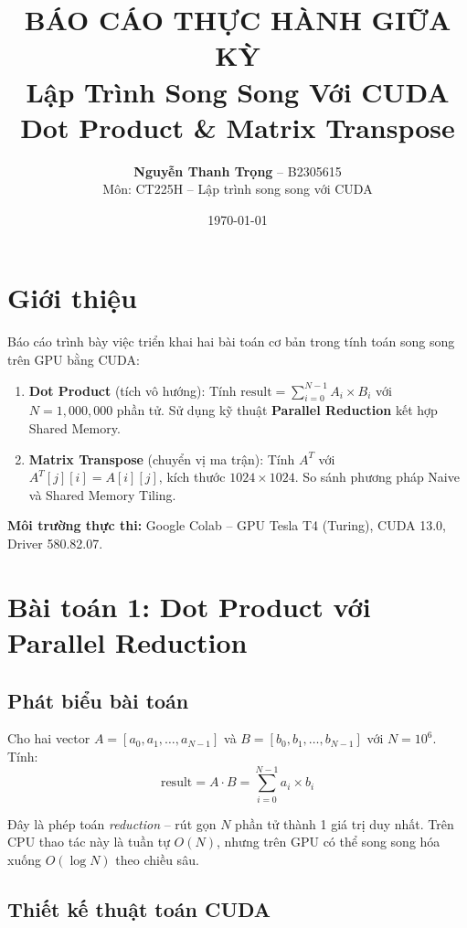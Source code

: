 \documentclass[12pt,a4paper]{article}
\title{
    \vspace{-1cm}
    \textbf{BÁO CÁO THỰC HÀNH GIỮA KỲ} \\[6pt]
    \Large Lập Trình Song Song Với CUDA \\[4pt]
    \large Dot Product \& Matrix Transpose
}
\author{
    \textbf{Nguyễn Thanh Trọng} -- B2305615 \\
    Môn: CT225H -- Lập trình song song với CUDA
}
\date{\today}
\begin{document}
\maketitle
\thispagestyle{fancy}

\section{Giới thiệu}

Báo cáo trình bày việc triển khai hai bài toán cơ bản trong tính toán song song trên GPU bằng CUDA:

\begin{enumerate}[leftmargin=2em]
    \item \textbf{Dot Product} (tích vô hướng): Tính $\displaystyle \text{result} = \sum_{i=0}^{N-1} A_i \times B_i$ với $N = 1{,}000{,}000$ phần tử. Sử dụng kỹ thuật \textbf{Parallel Reduction} kết hợp Shared Memory.
    \item \textbf{Matrix Transpose} (chuyển vị ma trận): Tính $A^T$ với $A^T[j][i] = A[i][j]$, kích thước $1024 \times 1024$. So sánh phương pháp Naive và Shared Memory Tiling.
\end{enumerate}

\noindent\textbf{Môi trường thực thi:} Google Colab -- GPU Tesla T4 (Turing), CUDA 13.0, Driver 580.82.07.

\section{Bài toán 1: Dot Product với Parallel Reduction}

\subsection{Phát biểu bài toán}

Cho hai vector $A = [a_0, a_1, \ldots, a_{N-1}]$ và $B = [b_0, b_1, \ldots, b_{N-1}]$ với $N = 10^6$. Tính:
\[
    \text{result} = A \cdot B = \sum_{i=0}^{N-1} a_i \times b_i
\]

Đây là phép toán \textit{reduction} -- rút gọn $N$ phần tử thành 1 giá trị duy nhất. Trên CPU thao tác này là tuần tự $O(N)$, nhưng trên GPU có thể song song hóa xuống $O(\log N)$ theo chiều sâu.

\subsection{Thiết kế thuật toán CUDA}
\end{document}
